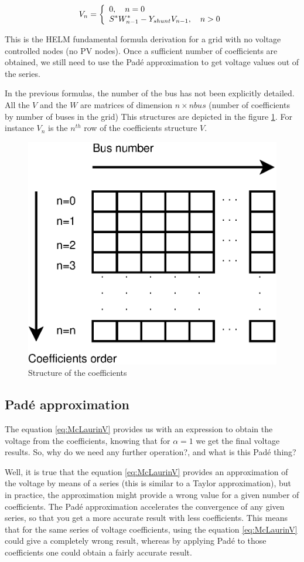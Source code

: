 \documentclass[nols,a4paper,twoside,symmetric,notoc,fleqn]{tufte-book}
\begin{document}
\begin{equation}
{V}_n =
\left\{
\begin{array}{ll}
\mathlarger{0}, \quad n=0\\
\mathlarger{{S}^* {W}^*_{n-1} - Y_{shunt} {V}_{n-1} }, \quad n>0
\end{array}
\right.
\end{equation}

This is the HELM fundamental formula derivation for a grid with no voltage controlled nodes (no PV nodes). Once a sufficient number of coefficients are obtained, we still need to use the Pad\'e approximation to get voltage values out of the series.


In the previous formulas, the number of the bus has not been explicitly detailed. All the ${V}$ and the ${W}$ are matrices of dimension $n \times nbus$ (number of coefficients by number of buses in the grid) This structures are depicted in the figure \ref{fig:CoefficientsStructure}. For instance ${V}_n$ is the $n^{th}$ row of the coefficients structure ${V}$.


\begin{figure}[h]
	\centering
	\includegraphics[width=0.4\linewidth]{img/CoefficientsStructure.eps}
	\caption{Structure of the coefficients}
	\label{fig:CoefficientsStructure}
\end{figure}

\subsection{Pad\'e approximation}

The equation \ref{eq:McLaurinV} provides us with an expression to obtain the voltage from the coefficients, knowing that for $\alpha=1$ we get the final voltage results. So, why do we need any further operation?, and what is this Pad\'e thing?

Well, it is true that the equation \ref{eq:McLaurinV} provides an approximation of the voltage by means of a series (this is similar to a Taylor approximation), but in practice, the approximation might provide a wrong value for a given number of coefficients. The Pad\'e approximation accelerates the convergence of any given series, so that you get a more accurate result with less coefficients. This means that for the same series of voltage coefficients, using the equation \ref{eq:McLaurinV} could give a completely wrong result, whereas by applying Pad\'e to those coefficients one could obtain a fairly accurate result.
\end{document}
